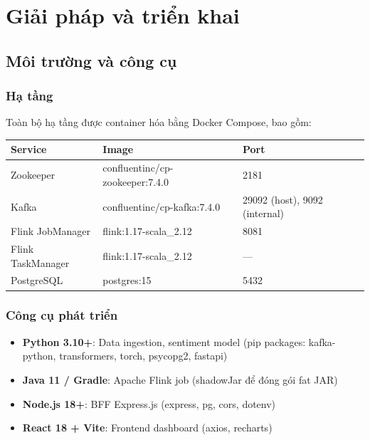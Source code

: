 \section{Giải pháp và triển khai}

\subsection{Môi trường và công cụ}

\subsubsection{Hạ tầng}

Toàn bộ hạ tầng được container hóa bằng Docker Compose, bao gồm:

\begin{table}[h]
\centering
\begin{tabular}{|l|l|l|}
\hline
\textbf{Service} & \textbf{Image} & \textbf{Port} \\
\hline
Zookeeper & confluentinc/cp-zookeeper:7.4.0 & 2181 \\
\hline
Kafka & confluentinc/cp-kafka:7.4.0 & 29092 (host), 9092 (internal) \\
\hline
Flink JobManager & flink:1.17-scala\_2.12 & 8081 \\
\hline
Flink TaskManager & flink:1.17-scala\_2.12 & --- \\
\hline
PostgreSQL & postgres:15 & 5432 \\
\hline
\end{tabular}
\end{table}

\subsubsection{Công cụ phát triển}

\begin{itemize}
    \item \textbf{Python 3.10+}: Data ingestion, sentiment model (pip packages: kafka-python, transformers, torch, psycopg2, fastapi)
    \item \textbf{Java 11 / Gradle}: Apache Flink job (shadowJar để đóng gói fat JAR)
    \item \textbf{Node.js 18+}: BFF Express.js (express, pg, cors, dotenv)
    \item \textbf{React 18 + Vite}: Frontend dashboard (axios, recharts)
\end{itemize}

